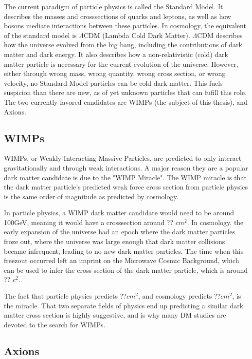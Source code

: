 The current paradigm of particle physics is called the Standard Model.
It describes the masses and crosssections of quarks and leptons, as well as how bosons mediate interactions between these particles.
In cosmology, the equivalent of the standard model is $\Lambda$CDM (Lambda Cold Dark Matter). 
$\Lambda$CDM describes how the universe evolved from the big bang, including the contributions of dark matter and dark energy.
It also describes how a non-relativistic (cold) dark matter particle is necessary for the current evolution of the universe.
However, either through wrong mass, wrong quantity, wrong cross section, or wrong velocity, no Standard Model particles can be cold dark matter.
This fuels suspicion than there are new, as of yet unknown particles that can fufill this role.
The two currently favored candidates are WIMPs (the subject of this thesis), and Axions.


\subsection{WIMPs}

WIMPs, or Weakly-Interacting Massive Particles, are predicted to only interact gravitationally and through weak interactions.
A major reason they are a popular dark matter candidate is due to the "WIMP Miracle".
The WIMP miracle is that the dark matter particle's predicted weak force cross section from particle physics is the same order of magnitude as predicted by cosmology.

In particle physics, a WIMP dark matter candidate would need to be around 100GeV, meaning it would have a crosssection around ?? $cm^{2}$.
In cosmology, the early expansion of the universe had an epoch where the dark matter particles froze out, where the universe was large enough that dark matter collisions became infrequent, leading to no new dark matter particles.
The time when this freezout occurred left an imprint on the Microwave Cosmic Background, which can be used to infer the cross section of the dark matter particle, which is around ?? $c^{2}$.

The fact that particle physics predicts ??$cm^{2}$, and cosmology predicts ??$cm^{2}$, is the miracle.
That two separate fields of physics end up predicting a similar dark matter cross section is highly suggestive, and is why many DM studies are devoted to the search for WIMPs.


\subsection{Axions}

